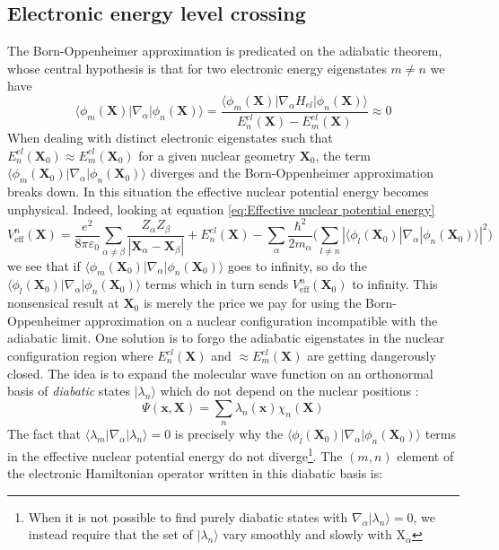 \documentclass[11pt,a4paper]{article}
\begin{document}
\subsection{Electronic energy level crossing}
The Born-Oppenheimer approximation is predicated on the adiabatic theorem, whose central hypothesis is that for two electronic energy eigenstates $m \neq n$ we have
\begin{equation*}
	\langle\phi_m(\mathbf{X}) | \nabla_\alpha |\phi_n(\mathbf{X})\rangle = \frac{\langle\phi_m(\mathbf{X}) | \nabla_\alpha H_{el} | \phi_n(\mathbf{X}) \rangle}{E_n^{el}(\mathbf{X}) - E_m^{el}(\mathbf{X})} \approx 0
\end{equation*}
When dealing with distinct electronic eigenstates such that $E_n^{el}(\mathbf{X}_0) \approx E_m^{el}(\mathbf{X}_0)$ for a given nuclear geometry $\mathbf{X}_0$, the term $\langle\phi_m(\mathbf{X}_0) | \nabla_\alpha |\phi_n(\mathbf{X}_0)\rangle$ diverges and the Born-Oppenheimer approximation breaks down. In this situation the effective nuclear potential energy becomes unphysical. Indeed, looking at equation \eqref{eq:Effective nuclear potential energy}
\begin{equation*}
	V_{\text{eff}}^n(\mathbf{X}) = \frac{e^2}{8\pi\varepsilon_0} \sum_{\alpha \neq \beta} \frac{Z_\alpha Z_\beta}{|\mathbf{X}_\alpha - \mathbf{X}_\beta|} + E_n^{el}(\mathbf{X}) - \sum_\alpha \frac{\hbar^2}{2m_\alpha} \Big(\sum_{l \neq n} |\langle\phi_l(\mathbf{X}_0) | \nabla_\alpha | \phi_n(\mathbf{X}_0)\rangle|^2\Big)
\end{equation*}
we see that if $\langle\phi_m(\mathbf{X}_0) | \nabla_\alpha |\phi_n(\mathbf{X}_0)\rangle$ goes to infinity, so do the $\langle\phi_l(\mathbf{X}_0) | \nabla_\alpha | \phi_n(\mathbf{X}_0)\rangle$ terms which in turn sends $V_{\text{eff}}^n(\mathbf{X}_0)$ to infinity. This nonsensical result at $\mathbf{X}_0$ is merely the price we pay for using the Born-Oppenheimer approximation on a nuclear configuration incompatible with the adiabatic limit.
One solution is to forgo the adiabatic eigenstates in the nuclear configuration region where $E_n^{el}(\mathbf{X})$ and $\approx E_m^{el}(\mathbf{X})$ are getting dangerously closed. The idea is to expand the molecular wave function on an orthonormal basis of \emph{diabatic} states $|\lambda_n\rangle$ which do not depend on the nuclear positions \cite{Smith1969}:
\begin{equation*}
	\Psi(\mathbf{x}, \mathbf{X}) = \sum_n \lambda_n(\mathbf{x}) \chi_n(\mathbf{X})
\end{equation*}
The fact that $\langle\lambda_m | \nabla_\alpha | \lambda_n \rangle = 0$ is precisely why the $\langle\phi_l(\mathbf{X}_0) | \nabla_\alpha | \phi_n(\mathbf{X}_0)\rangle$ terms in the effective nuclear potential energy do not diverge\footnote{When it is not possible to find purely diabatic states with $\nabla_{\alpha}|\lambda_n\rangle = 0$, we instead require that the set of $|\lambda_n\rangle$ vary smoothly and slowly with $\text{X}_{\alpha}$}. The $(m,n)$ element of the electronic Hamiltonian operator written in this diabatic basis is:
\end{document}
